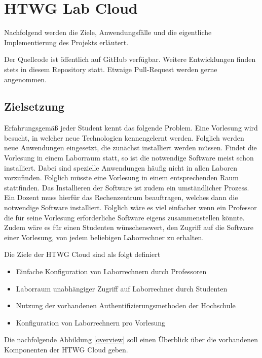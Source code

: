 \chapter{HTWG Lab Cloud}

Nachfolgend werden die Ziele, Anwendungsfälle und die eigentliche Implementierung des Projekts erläutert.

Der Quellcode ist öffentlich auf GitHub \cite{git-source} verfügbar. Weitere Entwicklungen finden stets in diesem Repository statt. Etwaige Pull-Request werden gerne angenommen.

\section{Zielsetzung}
Erfahrungsgemäß jeder Student kennt das folgende Problem. Eine Vorlesung wird
besucht, in welcher neue Technologien kennengelernt werden. Folglich werden neue Anwendungen
eingesetzt, die zunächst installiert werden müssen. 
Findet die Vorlesung in einem Laborraum statt, 
so ist die notwendige Software meist schon installiert.
Dabei sind spezielle Anwendungen häufig nicht in allen Laboren vorzufinden. Folglich müsste
eine Vorlesung in einem entsprechenden Raum stattfinden.
Das Installieren der Software ist zudem ein umständlicher Prozess. Ein Dozent muss hierfür
das Rechenzentrum beauftragen, welches dann die notwendige Software installiert.
Folglich wäre es viel einfacher wenn ein Professor die für seine Vorlesung erforderliche Software
eigens zusammenstellen könnte.
Zudem wäre es für einen Studenten wünschenswert, den Zugriff auf die Software einer Vorlesung,
von jedem beliebigen Laborrechner zu erhalten.

Die Ziele der HTWG Cloud sind als folgt definiert
\begin{itemize}
\item Einfache Konfiguration von Laborrechnern durch Professoren
\item Laborraum unabhängiger Zugriff auf Laborrechner durch Studenten
\item Nutzung der vorhandenen Authentifizierungsmethoden der Hochschule
\item Konfiguration von Laborrechnern pro Vorlesung
\end{itemize}

Die nachfolgende Abbildung \autoref{overview} soll einen Überblick über 
die vorhandenen Komponenten der HTWG Cloud geben.


